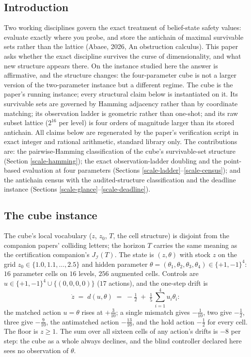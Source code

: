 \documentclass[10pt,twocolumn]{article}
\theoremstyle{plain}
\theoremstyle{definition}
\theoremstyle{remark}
\begin{document}
\subsection{Introduction}\label{scale-introduction}

Two working disciplines govern the exact treatment of belief-state safety values: evaluate exactly where you probe, and store the antichain of maximal survivable sets rather than the lattice (Abaee, 2026, An obstruction calculus). This paper asks whether the exact discipline survives the curse of dimensionality, and what new structure appears there. On the instance studied here the answer is affirmative, and the structure changes: the four-parameter cube is not a larger version of the two-parameter instance but a different regime. The cube is the paper's running instance; every structural claim below is instantiated on it.
Its survivable sets are governed by Hamming adjacency rather than by
coordinate matching; its observation ladder is geometric rather than
one-shot; and its raw subset lattice (\(2^{16}\) per level) is four
orders of magnitude larger than its stored antichain. All claims below
are regenerated by the paper's verification script in exact integer
and rational arithmetic, standard library only. The contributions are:
the pairwise-Hamming classification of the cube's survivable-set
structure (Section \ref{scale-hamming}); the exact observation-ladder
doubling and the point-based evaluation at four parameters (Sections
\ref{scale-ladder}--\ref{scale-census}); and the antichain census with the
audited-structure classification and the deadline instance (Sections
\ref{scale-glance}--\ref{scale-deadline}).

\subsection{The cube instance}\label{scale-instance}

The cube's local vocabulary (\(z\), \(z_{0}\), \(T\), the cell
structure) is disjoint from the companion papers' colliding letters;
the horizon \(T\) carries the same meaning as the certification
companion's \(J_{\mathcal{I}}(T)\). The state is \((z, \theta)\) with stock \(z\) on the grid
\(z_{0} \in \{1.0, 1.1, \dots, 2.5\}\) and hidden parameter
\(\theta = (\theta_{1}, \theta_{2}, \theta_{3}, \theta_{4}) \in
\{+1, -1\}^{4}\): \(16\) parameter cells on \(16\) levels, \(256\)
augmented cells. Controls are \(u \in \{+1,-1\}^{4} \cup \{(0,0,0,0)\}\)
(\(17\) actions), and the one-step drift is
\[
\dot z \;=\; d(u, \theta) \;=\; -\tfrac12
\;+\; \tfrac15\,\textstyle\sum_{i=1}^{4} u_{i}\theta_{i}:
\]
the matched action \(u = \theta\) rises at \(+\tfrac3{10}\); a single
mismatch gives \(-\tfrac1{10}\), two give \(-\tfrac12\), three give
\(-\tfrac9{10}\), the antimatched action \(-\tfrac{13}{10}\), and the
hold action \(-\tfrac12\) for every cell. The floor is \(z \ge 1\).
The sum over all sixteen cells of any action's drifts is \(-8\) per
step: the cube as a whole always declines, and the blind controller
declared here sees no observation of \(\theta\).
\end{document}
